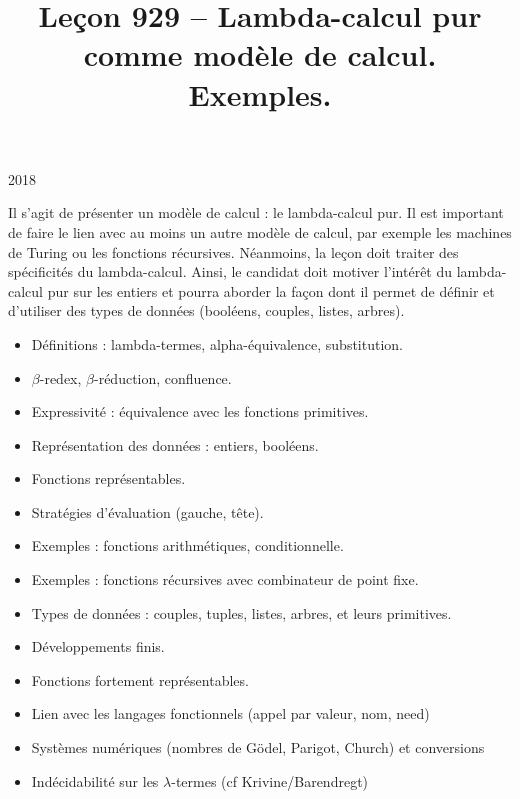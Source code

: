 \documentclass{agregfiche}
\title{Leçon 929 -- Lambda-calcul pur comme modèle de calcul. Exemples.}
\begin{document}
\maketitle

\secrapports

\begin{rapport}{2018}

Il s'agit de présenter un modèle de calcul : le lambda-calcul pur.
Il est important de faire le lien avec au moins un autre modèle de calcul, par exemple les machines de Turing ou les fonctions récursives.
Néanmoins, la leçon doit traiter des spécificités du lambda-calcul.
Ainsi, le candidat doit motiver l'intérêt du lambda-calcul pur sur les entiers et pourra aborder la façon dont il permet de définir et d'utiliser des types de données (booléens, couples, listes, arbres).

\end{rapport}

\secindispensables

\begin{itemize}
    \item Définitions : lambda-termes, alpha-équivalence, substitution.
    \item $\beta$-redex, $\beta$-réduction, confluence.
   	\item Expressivité : équivalence avec les fonctions primitives.
\end{itemize}

\secasavoir

\begin{itemize}
	\item Représentation des données : entiers, booléens.
	\item Fonctions représentables.
  	\item Stratégies d'évaluation (gauche, tête).
	\item Exemples : fonctions arithmétiques, conditionnelle.
	\item Exemples : fonctions récursives avec combinateur de point 
	fixe.
\end{itemize}

\secidees

\begin{itemize}
	\item Types de données : couples, tuples, listes, arbres, et leurs primitives.
	\item Développements finis.
	\item Fonctions fortement représentables.
	\item Lien avec les langages fonctionnels (appel par valeur, nom, need)
	\item Systèmes numériques (nombres de Gödel, Parigot, Church) et conversions
	\item Indécidabilité sur les $\lambda$-termes (cf Krivine/Barendregt)
\end{itemize}
\end{document}
